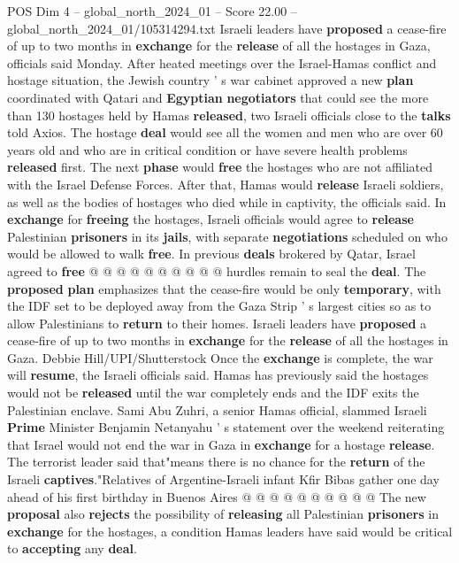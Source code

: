 \begin{textsample}{POS Dim 4 – global\_north\_2024\_01 – Score 22.00 – global\_north\_2024\_01/105314294.txt}  \label{ex:f4_pos_342}
Israeli leaders have \textbf{proposed} a cease-fire of up to two months in \textbf{exchange} for the \textbf{release} of all the hostages in Gaza, officials said Monday.
After heated meetings over the Israel-Hamas conflict and hostage situation, the Jewish country ' s war cabinet approved a new \textbf{plan} coordinated with Qatari and \textbf{Egyptian} \textbf{negotiators} that could see the more than 130 hostages held by Hamas \textbf{released}, two Israeli officials close to the \textbf{talks} told Axios.
The hostage \textbf{deal} would see all the women and men who are over 60 years old and who are in critical condition or have severe health problems \textbf{released} first.
The next \textbf{phase} would \textbf{free} the hostages who are not affiliated with the Israel Defense Forces.
After that, Hamas would \textbf{release} Israeli soldiers, as well as the bodies of hostages who died while in captivity, the officials said.
In \textbf{exchange} for \textbf{freeing} the hostages, Israeli officials would agree to \textbf{release} Palestinian \textbf{prisoners} in its \textbf{jails}, with separate \textbf{negotiations} scheduled on who would be allowed to walk \textbf{free}.
In previous \textbf{deals} brokered by Qatar, Israel agreed to \textbf{free} @ @ @ @ @ @ @ @ @ @ hurdles remain to seal the \textbf{deal}.
The \textbf{proposed} \textbf{plan} emphasizes that the cease-fire would be only \textbf{temporary}, with the IDF set to be deployed away from the Gaza Strip ' s largest cities so as to allow Palestinians to \textbf{return} to their homes.
Israeli leaders have \textbf{proposed} a cease-fire of up to two months in \textbf{exchange} for the \textbf{release} of all the hostages in Gaza.
Debbie Hill/UPI/Shutterstock Once the \textbf{exchange} is complete, the war will \textbf{resume}, the Israeli officials said.
Hamas has previously said the hostages would not be \textbf{released} until the war completely ends and the IDF exits the Palestinian enclave.
Sami Abu Zuhri, a senior Hamas official, slammed Israeli \textbf{Prime} Minister Benjamin Netanyahu ' s statement over the weekend reiterating that Israel would not end the war in Gaza in \textbf{exchange} for a hostage \textbf{release}.
The terrorist leader said that"means there is no chance for the \textbf{return} of the Israeli \textbf{captives}."Relatives of Argentine-Israeli infant Kfir Bibas gather one day ahead of his first birthday in Buenos Aires @ @ @ @ @ @ @ @ @ @ The new \textbf{proposal} also \textbf{rejects} the possibility of \textbf{releasing} all Palestinian \textbf{prisoners} in \textbf{exchange} for the hostages, a condition Hamas leaders have said would be critical to \textbf{accepting} any \textbf{deal}.

\end{textsample}
